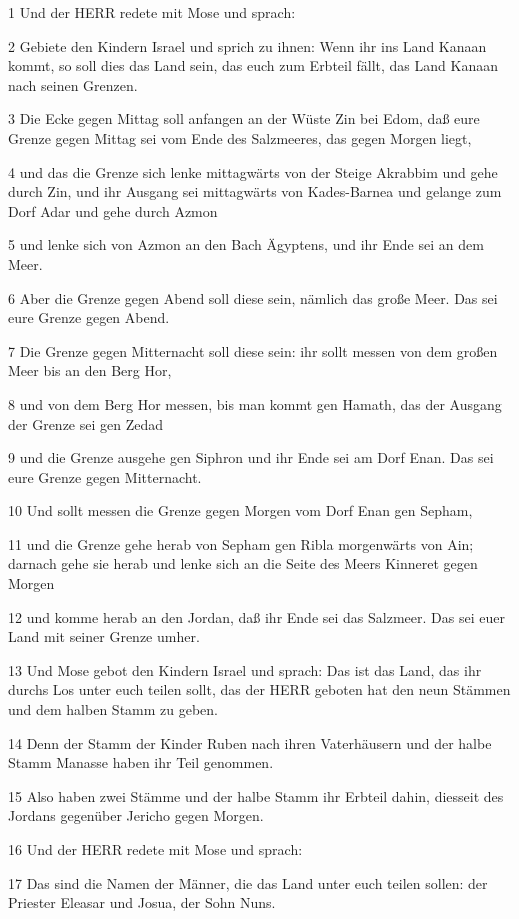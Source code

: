 \par 1 Und der HERR redete mit Mose und sprach:
\par 2 Gebiete den Kindern Israel und sprich zu ihnen: Wenn ihr ins Land Kanaan kommt, so soll dies das Land sein, das euch zum Erbteil fällt, das Land Kanaan nach seinen Grenzen.
\par 3 Die Ecke gegen Mittag soll anfangen an der Wüste Zin bei Edom, daß eure Grenze gegen Mittag sei vom Ende des Salzmeeres, das gegen Morgen liegt,
\par 4 und das die Grenze sich lenke mittagwärts von der Steige Akrabbim und gehe durch Zin, und ihr Ausgang sei mittagwärts von Kades-Barnea und gelange zum Dorf Adar und gehe durch Azmon
\par 5 und lenke sich von Azmon an den Bach Ägyptens, und ihr Ende sei an dem Meer.
\par 6 Aber die Grenze gegen Abend soll diese sein, nämlich das große Meer. Das sei eure Grenze gegen Abend.
\par 7 Die Grenze gegen Mitternacht soll diese sein: ihr sollt messen von dem großen Meer bis an den Berg Hor,
\par 8 und von dem Berg Hor messen, bis man kommt gen Hamath, das der Ausgang der Grenze sei gen Zedad
\par 9 und die Grenze ausgehe gen Siphron und ihr Ende sei am Dorf Enan. Das sei eure Grenze gegen Mitternacht.
\par 10 Und sollt messen die Grenze gegen Morgen vom Dorf Enan gen Sepham,
\par 11 und die Grenze gehe herab von Sepham gen Ribla morgenwärts von Ain; darnach gehe sie herab und lenke sich an die Seite des Meers Kinneret gegen Morgen
\par 12 und komme herab an den Jordan, daß ihr Ende sei das Salzmeer. Das sei euer Land mit seiner Grenze umher.
\par 13 Und Mose gebot den Kindern Israel und sprach: Das ist das Land, das ihr durchs Los unter euch teilen sollt, das der HERR geboten hat den neun Stämmen und dem halben Stamm zu geben.
\par 14 Denn der Stamm der Kinder Ruben nach ihren Vaterhäusern und der halbe Stamm Manasse haben ihr Teil genommen.
\par 15 Also haben zwei Stämme und der halbe Stamm ihr Erbteil dahin, diesseit des Jordans gegenüber Jericho gegen Morgen.
\par 16 Und der HERR redete mit Mose und sprach:
\par 17 Das sind die Namen der Männer, die das Land unter euch teilen sollen: der Priester Eleasar und Josua, der Sohn Nuns.
